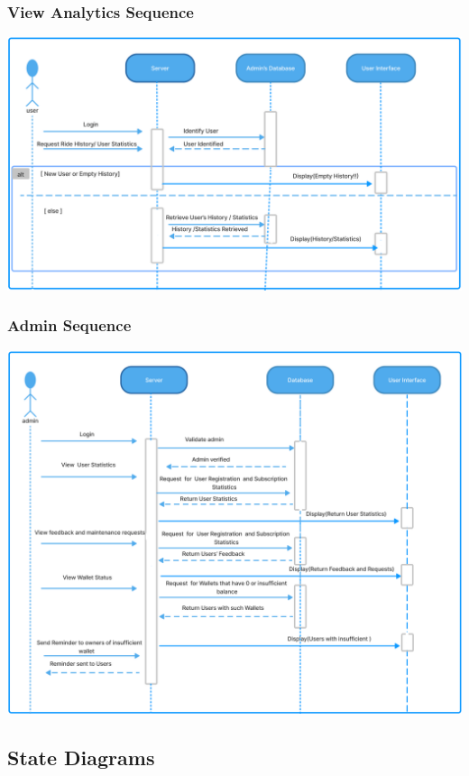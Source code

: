 \documentclass[11pt]{article}
\begin{document}
\subsubsection{View Analytics Sequence}
\begin{center}
  \includegraphics[scale=0.34]{sequence-diagram-images/analytics.png}
\end{center}

\subsubsection{Admin Sequence}
\begin{center}
  \includegraphics[scale=0.3]{sequence-diagram-images/admin.png}
\end{center}


\subsection{State Diagrams}
\end{document}
